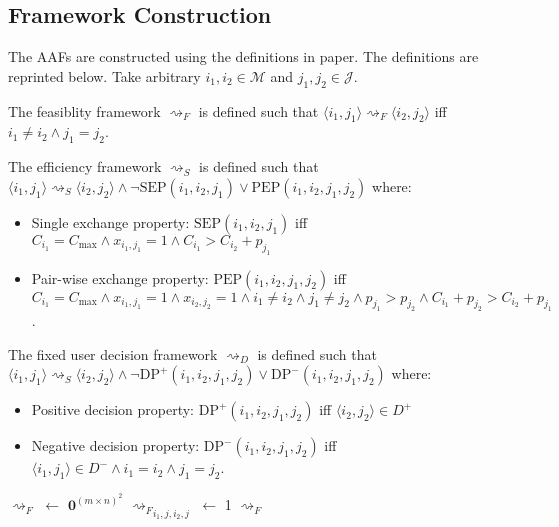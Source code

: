 \subsection{Framework Construction}

The AAFs are constructed using the definitions in paper.\cite{aes} The definitions are reprinted below. Take arbitrary $i_1,i_2\in\mathcal{M}$ and $j_1,j_2\in\mathcal{J}$.

\begin{definition}
	The feasiblity framework $\rightsquigarrow_F$ is defined such that $\langle i_1,j_1\rangle\rightsquigarrow_F\langle i_2,j_2\rangle$ iff $i_1\neq i_2\land j_1=j_2$.
\end{definition}

\begin{definition}
	The efficiency framework $\rightsquigarrow_S$ is defined such that $\langle i_1,j_1\rangle\rightsquigarrow_S\langle i_2,j_2\rangle\land\neg\text{SEP}(i_1,i_2,j_1)\lor\text{PEP}(i_1,i_2,j_1,j_2)$ where:
	\begin{itemize}
		\item Single exchange property: $\text{SEP}(i_1,i_2,j_1)$ iff $C_{i_1}=C_{\max}\land x_{i_1,j_1}=1\land C_{i_1}>C_{i_2}+p_{j_1}$
		\item Pair-wise exchange property: $\text{PEP}(i_1,i_2,j_1,j_2)$ iff $C_{i_1}=C_{\max}\land x_{i_1,j_1}=1\land x_{i_2,j_2}=1\land i_1\neq i_2\land j_1\neq j_2\land p_{j_1}>p_{j_2}\land C_{i_1}+p_{j_2}>C_{i_2}+p_{j_1}$.
	\end{itemize}
\end{definition}

\begin{definition}
	The fixed user decision framework $\rightsquigarrow_D$ is defined such that $\langle i_1,j_1\rangle\rightsquigarrow_S\langle i_2,j_2\rangle\land\neg\text{DP}^+(i_1,i_2,j_1,j_2)\lor\text{DP}^-(i_1,i_2,j_1,j_2)$ where:
	\begin{itemize}
		\item Positive decision property: $\text{DP}^+(i_1,i_2,j_1,j_2)$ iff $\langle i_2, j_2\rangle\in D^+$
		\item Negative decision property: $\text{DP}^-(i_1,i_2,j_1,j_2)$ iff $\langle i_1, j_1\rangle\in D^-\land i_1=i_2\land j_1=j_2$.
	\end{itemize}
\end{definition}

\begin{algorithm}[h!]
	\begin{algorithmic}[1]
			\State $\rightsquigarrow_F$ $\gets$ $\mathbf{0}^{(m\times n)^2}$
							\State ${\rightsquigarrow_F}_{i_1,j,i_2,j}$ $\gets$ 1
						\EndIf
					\EndFor
				\EndFor
			\EndFor
			\State \Return $\rightsquigarrow_F$
		\EndFunction
	\end{algorithmic}
\end{algorithm}

